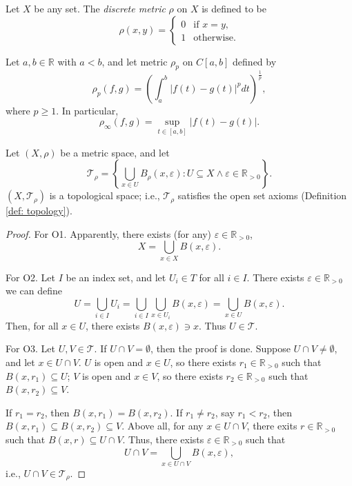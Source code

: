 \begin{example}
	\label{eg: discrete metric}
	Let $X$ be any set. The \textit{discrete metric} $\rho$ on $X$ is defined to be
	$$
	\rho(x,y) =
	\begin{cases}
		0 & \text{if $x = y$}, \\
		1 & \text{otherwise}.
	\end{cases}
	$$
\end{example}


\begin{example}
	Let $a,b \in \mathbb R$ with $a< b$, and let metric $\rho_p$ on $C[a,b]$ defined by
	$$
	\rho_p (f, g) = \left( \int_a^b |f(t) - g(t)|^p dt \right)^\frac{1}{p},
	$$
	where $p \ge 1$. In particular,
	$$
	\rho_\infty (f,g) = \sup_{t \in [a,b]} |f(t) - g(t)|.
	$$
\end{example}



\begin{theorem}
	Let $(X, \rho)$ be a metric space, and let
	$$
	\mathcal T_\rho = \left\{ \bigcup_{x \in U} B_\rho (x, \varepsilon) : U \subseteq X \land \varepsilon \in \mathbb R_{> 0} \right\}.
	$$
	$(X, \mathcal T_\rho)$ is a topological space; i.e., $\mathcal T_\rho$ satisfies the open set axioms (Definition \ref{def: topology}).
	
	\begin{proof}
		For O1. Apparently, there exists (for any) $\varepsilon \in \mathbb R_{> 0}$,
		$$
		X = \bigcup_{x \in X} B(x, \varepsilon).
		$$
		
		For O2. Let $I$ be an index set, and let $U_i \in T$ for all $i \in I$. There exists $\varepsilon \in \mathbb R_{> 0}$ we can define
		$$
		U = \bigcup_{i \in I} U_i = \bigcup_{i \in I} \bigcup_{x \in U_i} B(x, \varepsilon) = \bigcup_{x \in U} B(x, \varepsilon).
		$$
		Then, for all $x \in U$, there exists $B(x, \varepsilon) \ni x$. Thus $U \in \mathcal T$.
		
		For O3. Let $U, V \in \mathcal T$. If $U \cap V = \emptyset$, then the proof is done. Suppose $U \cap V \ne \emptyset$, and let $x \in U \cap V$. $U$ is open and $x \in U$, so there exists $r_1 \in \mathbb R_{> 0}$ such that $B(x, r_1) \subseteq U$; $V$ is open and $x \in V$, so there exists $r_2 \in \mathbb R_{> 0}$ such that $B(x, r_2) \subseteq V$.
		
		If $r_1 = r_2$, then $B(x, r_1) = B(x, r_2)$. If $r_1 \ne r_2$, say $r_1 < r_2$, then $B(x, r_1) \subseteq B(x, r_2) \subseteq V$. Above all, for any $x \in U \cap V$, there exits $r \in \mathbb R_{>0}$ such that $B(x, r) \subseteq U \cap V$. Thus, there exists $\varepsilon \in \mathbb R_{> 0}$ such that
		$$
		U \cap V = \bigcup_{x \in U \cap V} B(x, \varepsilon),
		$$
		i.e., $U \cap V \in \mathcal T_\rho$.
	\end{proof}
\end{theorem}



